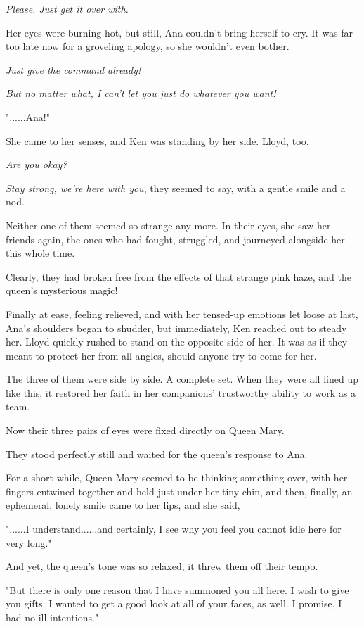 \documentclass[
]{article}
\begin{document}
\emph{Please. Just get it over with.}

Her eyes were burning hot, but still, Ana couldn't bring herself to cry.
It was far too late now for a groveling apology, so she wouldn't even
bother.

\emph{Just give the command already!}

\emph{But no matter what, I can't let you just do whatever you want!}

"......Ana!"

She came to her senses, and Ken was standing by her side. Lloyd, too.

\emph{Are you okay?}

\emph{Stay strong, we're here with you}, they seemed to say, with a
gentle smile and a nod.

Neither one of them seemed so strange any more. In their eyes, she saw
her friends again, the ones who had fought, struggled, and journeyed
alongside her this whole time.

Clearly, they had broken free from the effects of that strange pink
haze, and the queen's mysterious magic!

Finally at ease, feeling relieved, and with her tensed-up emotions let
loose at last, Ana's shoulders began to shudder, but immediately, Ken
reached out to steady her. Lloyd quickly rushed to stand on the opposite
side of her. It was as if they meant to protect her from all angles,
should anyone try to come for her.

The three of them were side by side. A complete set. When they were all
lined up like this, it restored her faith in her companions' trustworthy
ability to work as a team.

Now their three pairs of eyes were fixed directly on Queen Mary.

They stood perfectly still and waited for the queen's response to Ana.

For a short while, Queen Mary seemed to be thinking something over, with
her fingers entwined together and held just under her tiny chin, and
then, finally, an ephemeral, lonely smile came to her lips, and she
said,

"......I understand......and certainly, I see why you feel you cannot
idle here for very long."

And yet, the queen's tone was so relaxed, it threw them off their tempo.

"But there is only one reason that I have summoned you all here. I wish
to give you gifts. I wanted to get a good look at all of your faces, as
well. I promise, I had no ill intentions."
\end{document}
